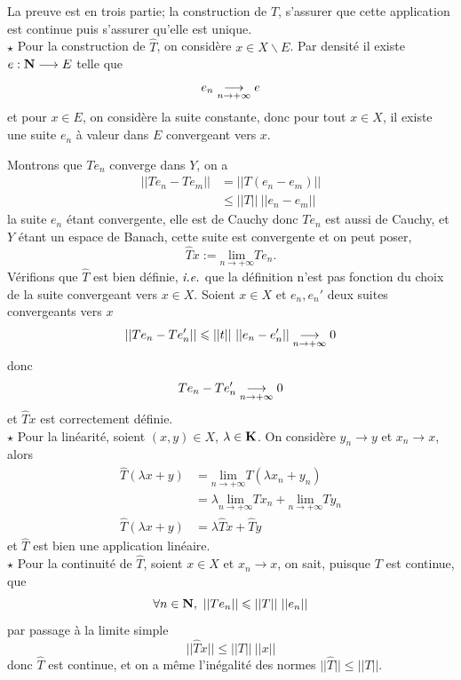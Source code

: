 \documentclass[a4paper,11pt, twoside]{article}
\begin{document}
\begin{Proof}
  La preuve est en trois partie; la construction de $\hat T$, s'assurer que cette application est continue puis s'assurer qu'elle est unique.\\

  $\star$ Pour la construction de $\hat T$, on considère $x\in X\backslash E$. Par densité il existe $e:\mathbf N\longrightarrow E$ telle que 
  $$e_n\underset{n\to+\infty}{\longrightarrow} e$$
  et pour $x\in E$, on considère la suite constante, donc pour tout $x\in X$, il existe une suite $e_n$ à valeur dans $E$ convergeant vers $x$.

  Montrons que $Te_n$ converge dans $Y$, on a 
  \begin{align*}
    ||Te_n-Te_m||&=||T(e_n-e_m)||\\
    &\leqslant ||T||\ ||e_n-e_m||
  \end{align*}
  la suite $e_n$ étant convergente, elle est de Cauchy donc $Te_n$ est aussi de Cauchy, et $Y$ étant un espace de Banach, cette suite est convergente et on peut poser, 
  $$\hat Tx:=\underset{n\to+\infty}{\mathrm{lim}}Te_n.$$
  Vérifions que $\hat T$ est bien définie, $\emph{i.e.}$ que la définition n'est pas fonction du choix de la suite convergeant vers $x\in X$. Soient $x\in X$ et $e_n,e_n'$ deux suites convergeants vers $x$
  $$||Te_n-Te_n'||\leqslant||t||\ ||e_n-e_n'||\tend0$$
  donc 
  $$Te_n-Te_n'\underset{n\to+\infty}{\longrightarrow} 0$$
  et $\hat Tx$ est correctement définie.\\

  $\star$ Pour la linéarité, soient $(x,y)\in X$, $\lambda\in\mathbf K$. On considère $y_n\longrightarrow y$ et $x_n\longrightarrow x$, alors
  \begin{align*}
    \hat T(\lambda x+y)&=\underset{n\to+\infty}{\mathrm{lim}}T(\lambda x_n+y_n)\\
    &=\lambda\underset{n\to+\infty}{\mathrm{lim}}Tx_n+\underset{n\to+\infty}{\mathrm{lim}}Ty_n\\
    \hat T(\lambda x+y)&=\lambda\hat Tx+\hat Ty
  \end{align*}
  et $\hat T$ est bien une application linéaire.\\

  $\star$ Pour la continuité de $\hat T$, soient $x\in X$ et $x_n\longrightarrow x$, on sait, puisque $T$ est continue, que 
  $$\forall n\in\N,\ ||Te_n||\leqslant ||T||\ ||e_n||$$
  par passage à la limite simple
  $$||\hat Tx||\leqslant ||T||\ ||x||$$
  donc $\hat T$ est continue, et on a même l'inégalité des normes $||\hat T||\leqslant ||T||$.\\


\end{Proof}
\end{document}
